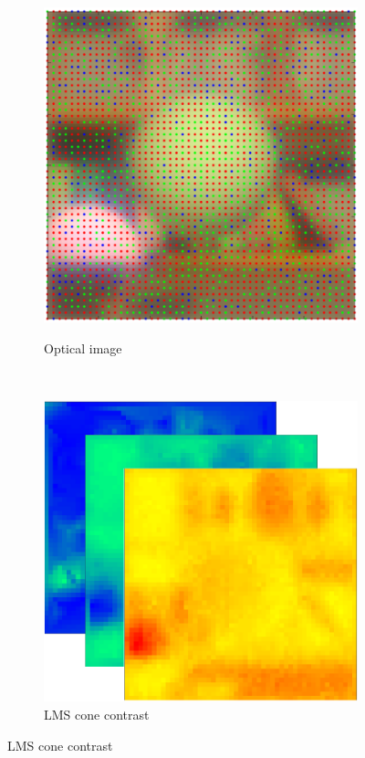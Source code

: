 \documentclass{jov}
\begin{document}
\begin{figure}
\begin{subfigure}[b]{0.19 \textwidth}
        \label{fig:croppedImage}
    \end{subfigure}
    ~ 
    \begin{subfigure}[b]{0.19 \textwidth}
    \hspace{0.1 \textwidth}
        \caption{Optical image}
        \vspace{1.5mm}
        \includegraphics[width=\textwidth]{../FiguresDraft4/Figure9/Figure9_c.png}
        \label{fig:croppedImageWithMosaic}
    \end{subfigure}
    ~
    \begin{subfigure}[b]{0.2 \textwidth}
        \caption{LMS cone contrast}
        \includegraphics[width=\textwidth]{../FiguresDraft4/Figure9/Figure9_d.png}

\end{subfigure}
\end{figure}
\end{document}
